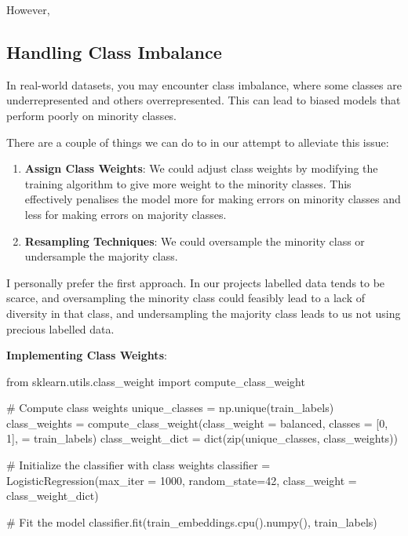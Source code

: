 \documentclass[
  letterpaper,
  DIV=11,
  numbers=noendperiod]{scrreprt}
\newenvironment{Shaded}{\begin{snugshade}}{\end{snugshade}}
\newcommand{\BuiltInTok}[1]{\textcolor[rgb]{0.00,0.23,0.31}{#1}}
\newcommand{\CommentTok}[1]{\textcolor[rgb]{0.37,0.37,0.37}{#1}}
\newcommand{\DecValTok}[1]{\textcolor[rgb]{0.68,0.00,0.00}{#1}}
\newcommand{\ImportTok}[1]{\textcolor[rgb]{0.00,0.46,0.62}{#1}}
\newcommand{\NormalTok}[1]{\textcolor[rgb]{0.00,0.23,0.31}{#1}}
\newcommand{\OperatorTok}[1]{\textcolor[rgb]{0.37,0.37,0.37}{#1}}
\newcommand{\StringTok}[1]{\textcolor[rgb]{0.13,0.47,0.30}{#1}}
\providecommand{\tightlist}{%
  \setlength{\itemsep}{0pt}\setlength{\parskip}{0pt}}\usepackage{longtable,booktabs,array}
\begin{document}
However,

\subsection{Handling Class Imbalance}\label{handling-class-imbalance}

In real-world datasets, you may encounter class imbalance, where some
classes are underrepresented and others overrepresented. This can lead
to biased models that perform poorly on minority classes.

There are a couple of things we can do to in our attempt to alleviate
this issue:

\begin{enumerate}
\def\labelenumi{\arabic{enumi}.}
\tightlist
\item
  \textbf{Assign Class Weights}: We could adjust class weights by
  modifying the training algorithm to give more weight to the minority
  classes. This effectively penalises the model more for making errors
  on minority classes and less for making errors on majority classes.
\item
  \textbf{Resampling Techniques}: We could oversample the minority class
  or undersample the majority class.
\end{enumerate}

I personally prefer the first approach. In our projects labelled data
tends to be scarce, and oversampling the minority class could feasibly
lead to a lack of diversity in that class, and undersampling the
majority class leads to us not using precious labelled data.

\textbf{Implementing Class Weights}:

\begin{Shaded}
\begin{Highlighting}[]
\ImportTok{from}\NormalTok{ sklearn.utils.class\_weight }\ImportTok{import}\NormalTok{ compute\_class\_weight}

\CommentTok{\# Compute class weights}
\NormalTok{unique\_classes }\OperatorTok{=}\NormalTok{ np.unique(train\_labels)}
\NormalTok{class\_weights }\OperatorTok{=}\NormalTok{ compute\_class\_weight(class\_weight }\OperatorTok{=} \StringTok{\textquotesingle{}balanced\textquotesingle{}}\NormalTok{, classes }\OperatorTok{=}\NormalTok{ [}\DecValTok{0}\NormalTok{, }\DecValTok{1}\NormalTok{],  }\OperatorTok{=}\NormalTok{ train\_labels)}
\NormalTok{class\_weight\_dict }\OperatorTok{=} \BuiltInTok{dict}\NormalTok{(}\BuiltInTok{zip}\NormalTok{(unique\_classes, class\_weights))}

\CommentTok{\# Initialize the classifier with class weights}
\NormalTok{classifier }\OperatorTok{=}\NormalTok{ LogisticRegression(max\_iter }\OperatorTok{=} \DecValTok{1000}\NormalTok{, random\_state}\OperatorTok{=}\DecValTok{42}\NormalTok{, class\_weight }\OperatorTok{=}\NormalTok{ class\_weight\_dict)}

\CommentTok{\# Fit the model}
\NormalTok{classifier.fit(train\_embeddings.cpu().numpy(), train\_labels)}
\end{Highlighting}
\end{Shaded}
\end{document}
